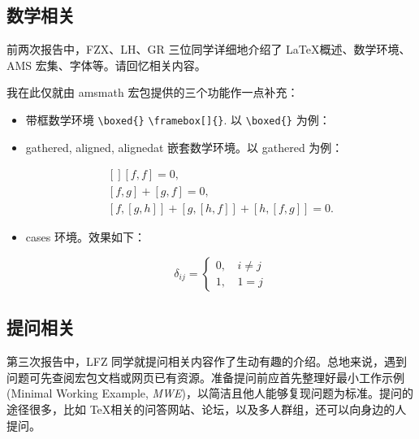 \subsection{数学相关}
前两次报告中，FZX、LH、GR 三位同学详细地介绍了 \LaTeX 概述、数学环境、AMS 宏集、字体等。请回忆相关内容。

我在此仅就由 amsmath 宏包提供的三个功能作一点补充：
\begin{itemize}
\item 带框数学环境 \verb|\boxed{}| \verb|\framebox[]{}|. 以 \verb|\boxed{}| 为例：
\begin{vertlst}

\boxed{\e^{\iu \theta} = \cos{\theta} + \iu \sin{\theta}}
\end{vertlst}
\item \textsf{gathered}, \textsf{aligned}, \textsf{alignedat} 嵌套数学环境。以 gathered 为例：
\begin{vertlst}

\begin{equation}
\begin{gathered}[]
  [f, f] = 0, \\
  [f, g] + [g, f] = 0, \\
  [f, [g, h]] + [g, [h, f]] + [h, [f, g]] = 0.
\end{gathered}
\end{equation} 
\end{vertlst}
\item cases 环境。效果如下：
\begin{sidelst}
\begin{equation}
  \delta_{ij} =
  \begin{cases}
    0, \, & i \ne j \\
    1, & 1 = j
  \end{cases}
\end{equation}
\end{sidelst}
\end{itemize}


\subsection{提问相关}
第三次报告中，LFZ 同学就提问相关内容作了生动有趣的介绍。总地来说，遇到问题可先查阅宏包文档或网页已有资源。准备提问前应首先整理好最小工作示例 (Minimal Working Example, \emph{MWE})，以简洁且他人能够复现问题为标准。提问的途径很多，比如 \TeX 相关的问答网站、论坛，以及多人群组，还可以向身边的人提问。